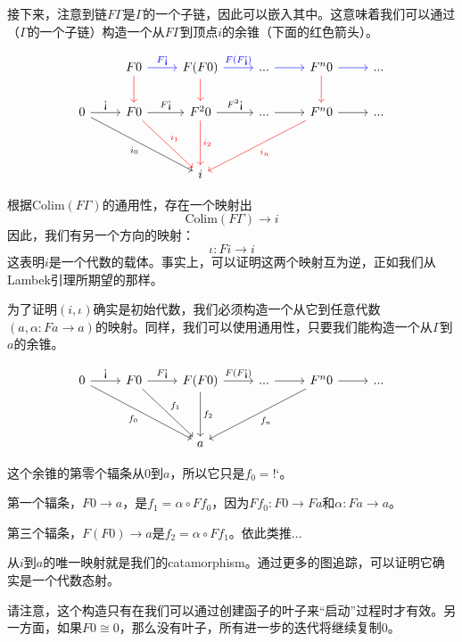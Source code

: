 \documentclass[DaoFP]{subfiles}
\begin{document}
接下来，注意到链$F \Gamma$是$\Gamma$的一个子链，因此可以嵌入其中。这意味着我们可以通过（$\Gamma$的一个子链）构造一个从$F \Gamma$到顶点$i$的余锥（下面的红色箭头）。

\[
 \begin{tikzcd}
 & F 0
  \arrow[r, blue, "F\mbox{!`}"]
  \arrow[d, red]
& F (F 0)
  \arrow[r, blue, "F(F\mbox{!`})"]
  \arrow[d, red]
 & ...
 \arrow[r, blue]
 & F^{n} 0
  \arrow[r, blue]
  \arrow[d, red]
 & ...
 \\
  0
 \arrow[r, "\mbox{!`}"]
 \arrow[ddrr,  "i_0"']
 &  F 0
  \arrow[r, "F  \mbox{!`}"]
 \arrow[ddr, red, "i_1"]
& F^2 0
  \arrow[r, "F^2\mbox{!`}"]
  \arrow[dd, red, "i_2"]
 & ...
 \arrow[r]
 & F^n 0
  \arrow[r]
 \arrow[ddll, red, "i_n"]
 & ...
 \\
 \\
 &&i
  \end{tikzcd}
\]

根据$\text{Colim} (F \Gamma)$的通用性，存在一个映射出
\[\text{Colim} (F \Gamma) \to i \]
因此，我们有另一个方向的映射：
\[ \iota \colon F i \to i \]
这表明$i$是一个代数的载体。事实上，可以证明这两个映射互为逆，正如我们从Lambek引理所期望的那样。

为了证明$(i, \iota)$确实是初始代数，我们必须构造一个从它到任意代数$(a, \alpha \colon F a \to a)$的映射。同样，我们可以使用通用性，只要我们能构造一个从$\Gamma$到$a$的余锥。

\[
 \begin{tikzcd}
 0
 \arrow[r, "\mbox{!`}"]
 \arrow[ddrr, "f_0"']
 & F 0
  \arrow[r, "F\mbox{!`}"]
 \arrow[ddr, "f_1"]
& F (F 0)
  \arrow[r, "F(F\mbox{!`})"]
  \arrow[dd, "f_2"]
 & ...
 \arrow[r]
 & F^n 0
  \arrow[r]
 \arrow[ddll, "f_n"]
 & ...
 \\
 \\
 &&a
  \end{tikzcd}
\]

这个余锥的第零个辐条从$0$到$a$，所以它只是$f_0 = \mbox{!`}$。

第一个辐条，$F 0 \to a$，是$f_1 = \alpha \circ F f_0$，因为$F f_0 \colon F 0 \to F a$和$\alpha \colon F a \to a$。

第三个辐条，$F (F 0) \to a$是$f_2 = \alpha \circ F f_1$。依此类推...

从$i$到$a$的唯一映射就是我们的catamorphism。通过更多的图追踪，可以证明它确实是一个代数态射。

请注意，这个构造只有在我们可以通过创建函子的叶子来“启动”过程时才有效。另一方面，如果$F 0 \cong 0$，那么没有叶子，所有进一步的迭代将继续复制$0$。
\end{document}
